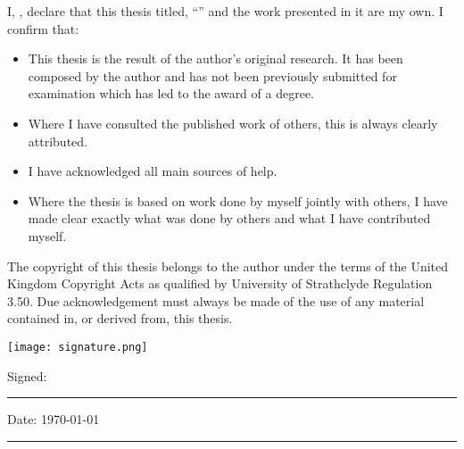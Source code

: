 \documentclass[
11pt, %
oneside, %
english, %
onehalfspacing, %
nolistspacing, %
liststotoc, %
headsepline, %
chapterinoneline, %
]{MastersDoctoralThesis} %
\begin{document}

\begin{declaration}


\noindent I, \authorname, declare that this thesis titled, \enquote{\ttitle} and the work presented in it are my own. I confirm that:

\begin{itemize} 
\item This thesis is the result of the author’s original research. It has been composed by
the author and has not been previously submitted for examination which has led to
the award of a degree.

\item Where I have consulted the published work of others, this is always clearly attributed.
\item I have acknowledged all main sources of help.
\item Where the thesis is based on work done by myself jointly with others, I have made clear exactly what was done by others and what I have contributed myself.

\end{itemize}

The copyright of this thesis belongs to the author under the terms of the United
Kingdom Copyright Acts as qualified by University of Strathclyde Regulation 3.50.
Due acknowledgement must always be made of the use of any material contained
in, or derived from, this thesis.

\vfill

\begin{flushleft}
\hspace{0.2\textwidth}
\vspace{-.06\textheight}
 \texttt{[image: signature.png]}
\end{flushleft} 

\noindent Signed: \\
\rule[0.5em]{25em}{0.5pt} %
 
\noindent Date: \today\\
\rule[0.5em]{25em}{0.5pt} %
\end{declaration}

\cleardoublepage
\end{document}
